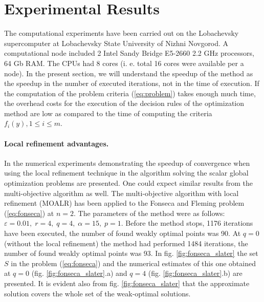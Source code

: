 \documentclass{llncs}
\begin{document}
\section{Experimental Results}
The computational experiments have been carried out on the Lobachevsky supercomputer at
Lobachevsky State University of Nizhni Novgorod. A computational node included 2 Intel
Sandy Bridge E5-2660 2.2 GHz processors, 64 Gb RAM. The CPUs had 8 cores (i. e. total 16 cores
were available per a node).
In the present section, we will understand the speedup of the method as the speedup in the
number of executed iterations, not in the time of execution. If the computation of the problem
criteria (\ref{eq:problem}) takes enough much time, the overhead costs for the execution of the
decision rules of the optimization method are low as compared to the time of computing the
criteria \(f_i(y), 1\leqslant i\leqslant m\).

\paragraph{Local refinement advantages.} In \cite{barkalovLebedev2016} the numerical
experiments demonstrating the speedup of convergence when using the local refinement
technique in the algorithm solving the scalar global optimization problems are presented. One
could expect similar results from the multi-objective algorithm as well. The multi-objective
algorithm with local refinement (MOALR) has been applied to the  Fonseca and Fleming
problem (\ref{eq:fonseca}) at \(n=2\). The parameters of the method were as follows:
\(\varepsilon=0.01,\;r=4,\;q=4,\;\alpha=15,\;p=1\). Before the method stops, 1176 iterations
have been executed, the number of found weakly optimal points was 90. At \(q=0\) (without the
local refinement) the method had performed 1484 iterations, the number of found weakly
optimal points was 93. In fig. \ref{fig:fonseca_slater} the set \(S\) in the problem
(\ref{eq:fonseca}) and the numerical estimates of this one obtained at \(q=0\) (fig.
\ref{fig:fonseca_slater}.a) and \(q=4\) (fig. \ref{fig:fonseca_slater}.b) are presented. It is
evident also from fig. \ref{fig:fonseca_slater} that the approximate solution covers the whole
set of the weak-optimal solutions.
\end{document}
